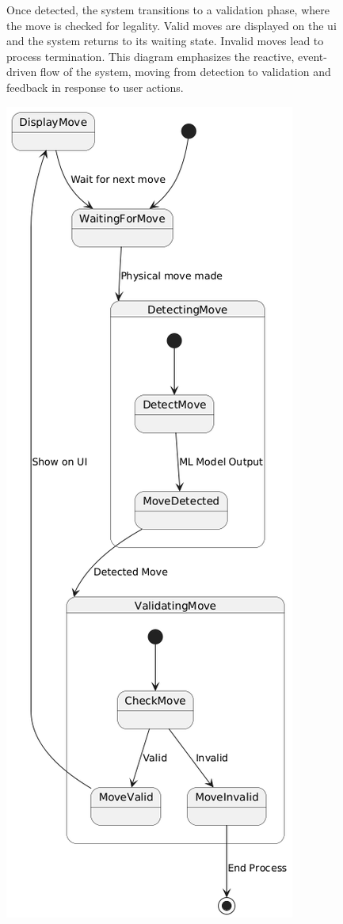 \begin{figure}[H]
\begin{minipage}[t]{0.5\textwidth}
        Once detected, the system transitions to a validation phase, where the move is checked for legality. Valid moves are displayed on the \gls{ui} and the system returns to its waiting state. Invalid moves lead to process termination. This diagram emphasizes the reactive, event-driven flow of the system, moving from detection to validation and feedback in response to user actions.
    \end{minipage}
    \hfill
    \begin{minipage}[t]{0.45\textwidth}
        \vspace{0pt}
        \includegraphics[width=\linewidth]{figures/results/uml/state-machine.png}

\end{minipage}
\end{figure}
